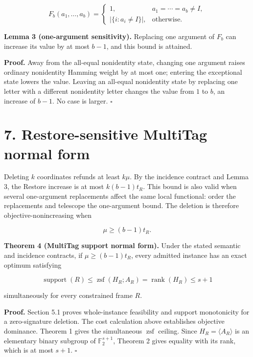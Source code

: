 \documentclass[11pt]{article}
\begin{document}
\[
F_b(a_1,\ldots,a_b)=
\begin{cases}
1, & a_1=\cdots=a_b\neq I,\\
|\{i:a_i\neq I\}|, & \text{otherwise}.
\end{cases}
\]

\textbf{Lemma 3 (one-argument sensitivity).} Replacing one argument of \(F_b\) can increase its value by at most \(b-1\), and this bound is attained.

\textbf{Proof.} Away from the all-equal nonidentity state, changing one argument raises ordinary nonidentity Hamming weight by at most one; entering the exceptional state lowers the value. Leaving an all-equal nonidentity state by replacing one letter with a different nonidentity letter changes the value from \(1\) to \(b\), an increase of \(b-1\). No case is larger. \(\square\)

\hypertarget{restore-sensitive-multitag-normal-form}{%
\section*{7. Restore-sensitive MultiTag normal form}\label{restore-sensitive-multitag-normal-form}}

Deleting \(k\) coordinates refunds at least \(k\mu\). By the incidence contract and Lemma 3, the Restore increase is at most \(k(b-1)t_R\). This bound is also valid when several one-argument replacements affect the same local functional: order the replacements and telescope the one-argument bound. The deletion is therefore objective-nonincreasing when

\[
\mu\geq (b-1)t_R.
\]

\textbf{Theorem 4 (MultiTag support normal form).} Under the stated semantic and incidence contracts, if \(\mu\geq (b-1)t_R\), every admitted instance has an exact optimum satisfying

\[
\operatorname{support}(R)
\leq
\operatorname{zsf}(H_R;A_R)
=
\operatorname{rank}(H_R)
\leq s+1
\]

simultaneously for every constrained frame \(R\).

\textbf{Proof.} Section 5.1 proves whole-instance feasibility and support monotonicity for a zero-signature deletion. The cost calculation above establishes objective dominance. Theorem 1 gives the simultaneous \(\operatorname{zsf}\) ceiling. Since \(H_R=\langle A_R\rangle\) is an elementary binary subgroup of \(\mathbb{F}_2^{s+1}\), Theorem 2 gives equality with its rank, which is at most \(s+1\). \(\square\)
\end{document}
